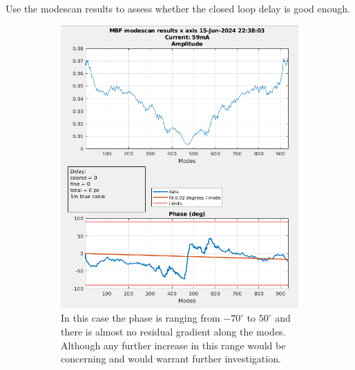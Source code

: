 \documentclass{report}
\begin{document}
Use the modescan results to assess whether the closed loop delay is good enough.
 \begin{figure}[hbt]
   \centering
    \begin{subfigure}[b]{0.48\textwidth}
        \includegraphics[width=\textwidth]{modescan_x.png}
        \caption{In this case the phase is ranging from $-70^\circ$ to $50^\circ$ and there is almost no residual gradient along the modes. Although any further increase in this range would be concerning and would warrant further investigation.}
        \label{fig:example_modescan_x}
    \end{subfigure}
    \begin{subfigure}[b]{0.48\textwidth}

\end{subfigure}
\end{figure}
\end{document}

